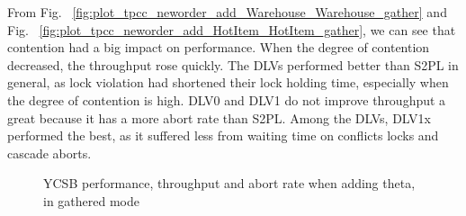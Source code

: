 \documentclass[conference]{IEEEtran}
\begin{document}
From Fig. ~\ref{fig:plot_tpcc_neworder_add_Warehouse_Warehouse_gather} and 
Fig. ~\ref{fig:plot_tpcc_neworder_add_HotItem_HotItem_gather}, 
we can see that contention had a big impact on performance. When the degree of contention decreased, the throughput rose quickly.
The DLVs performed better than S2PL in general, as lock violation had shortened their lock holding time, especially when the degree of contention is high. 
DLV0 and DLV1 do not improve throughput a great because it has a more abort rate than S2PL.
Among the DLVs, DLV1x performed the best, as it suffered less from waiting time on conflicts locks and cascade aborts.

\begin{figure}[htbp]
  \centering
  


\caption{YCSB performance, throughput and abort rate when adding theta, in gathered mode}
\label{fig:plot_ycsb_add_Theta_Theta_TPM_gather}
\end{figure}
\end{document}
